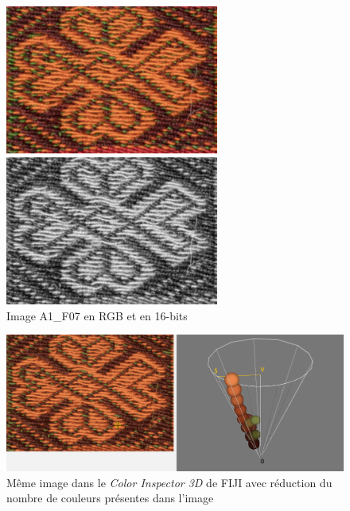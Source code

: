 \documentclass[a4paper, twoside, 12pt]{book}
\begin{document}
\begin{figure}[!h]
    \begin{minipage}[c]{.5\linewidth}
            \begin{center}
                \includegraphics[width=7cm]{images/A1_F07.jpg}
            \end{center}
    \end{minipage}
    \begin{minipage}[c]{.5\linewidth}
        \begin{center}
            \includegraphics[width=7cm]{images/A1_F07_16bits.jpg}
        \end{center}
    \end{minipage}
    \caption{Image A1\_F07 en RGB et en 16-bits}
\end{figure}

\begin{figure}[!h]
    \begin{center}
    \includegraphics[width=16cm]{images/WuQuant_15col.png}
    \caption[\textit{Color Inspector 3D}]{ Même image dans le \textit{Color Inspector 3D} de FIJI avec réduction du nombre de couleurs présentes dans l'image}
    \label{couleur}
    \end{center}
\end{figure}
\end{document}
